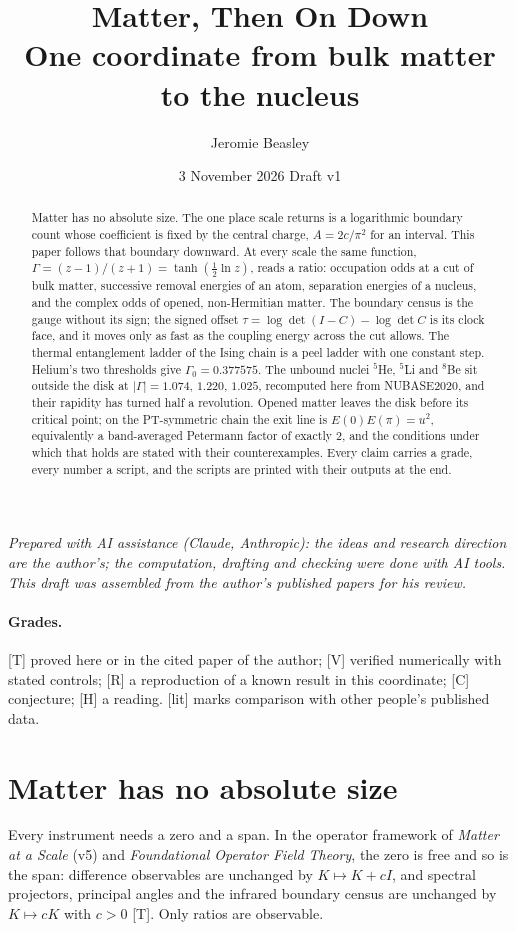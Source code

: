 \documentclass[11pt]{article}
\title{Matter, Then On Down\\[4pt]\large One coordinate from bulk matter to the nucleus}
\author{Jeromie Beasley}
\date{3 November 2026 \quad Draft v1}
\theoremstyle{definition}
\newcommand{\grade}[1]{\textsf{\small[#1]}}
\begin{document}
\maketitle

\noindent\emph{Prepared with AI assistance (Claude, Anthropic): the ideas and research direction are the author's; the computation, drafting and checking were done with AI tools. This draft was assembled from the author's published papers for his review.}

\begin{abstract}
Matter has no absolute size. The one place scale returns is a logarithmic boundary count whose coefficient is fixed by the central charge, $A=2c/\pi^2$ for an interval. This paper follows that boundary downward. At every scale the same function, $\Gamma=(z-1)/(z+1)=\tanh(\tfrac12\ln z)$, reads a ratio: occupation odds at a cut of bulk matter, successive removal energies of an atom, separation energies of a nucleus, and the complex odds of opened, non-Hermitian matter. The boundary census is the gauge without its sign; the signed offset $\tau=\log\det(I-C)-\log\det C$ is its clock face, and it moves only as fast as the coupling energy across the cut allows. The thermal entanglement ladder of the Ising chain is a peel ladder with one constant step. Helium's two thresholds give $\Gamma_0=0.377575$. The unbound nuclei ${}^5$He, ${}^5$Li and ${}^8$Be sit outside the disk at $|\Gamma|=1.074$, $1.220$, $1.025$, recomputed here from NUBASE2020, and their rapidity has turned half a revolution. Opened matter leaves the disk before its critical point; on the PT-symmetric chain the exit line is $E(0)E(\pi)=u^2$, equivalently a band-averaged Petermann factor of exactly 2, and the conditions under which that holds are stated with their counterexamples. Every claim carries a grade, every number a script, and the scripts are printed with their outputs at the end.
\end{abstract}

\paragraph{Grades.} \grade{T} proved here or in the cited paper of the author; \grade{V} verified numerically with stated controls; \grade{R} a reproduction of a known result in this coordinate; \grade{C} conjecture; \grade{H} a reading. \grade{lit} marks comparison with other people's published data.

\section{Matter has no absolute size}
Every instrument needs a zero and a span. In the operator framework of \emph{Matter at a Scale} (v5) and \emph{Foundational Operator Field Theory}, the zero is free and so is the span: difference observables are unchanged by $K\mapsto K+cI$, and spectral projectors, principal angles and the infrared boundary census are unchanged by $K\mapsto cK$ with $c>0$ \grade{T}. Only ratios are observable.
\end{document}
